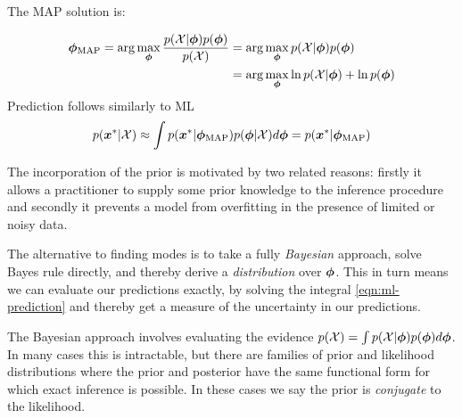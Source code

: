 The MAP solution is:

\begin{align}
{ { {  \bm \phi  } }_{\text{MAP}} } = \arg \max_{{ \bm \phi }} \frac{p({ \mathcal{X} } | { \bm \phi })p({ \bm \phi })}{p({ \mathcal{X} })}
 & = \arg \max_{{ \bm \phi }} p({ \mathcal{X} } | { \bm \phi })p({ \bm \phi }) \\
 & = \arg \max_{ \bm \phi } \ln p({ \mathcal{X} } | { \bm \phi }) + \ln p({ \bm \phi })
\end{align}
Prediction follows similarly to ML
\begin{align}
p({ \bm x^{*} } | { \mathcal{X} }) \approx \int p({ \bm x^{*} } | { {{ \bm \phi }}_{\text{MAP}} })p({ \bm \phi }|{ \mathcal{X} })d{ \bm \phi } = p({ \bm x^{*} } | { {{ \bm \phi }}_{\text{MAP}} })
\end{align}



The incorporation of the prior is motivated by two related reasons: firstly it allows a practitioner to supply some prior knowledge to the inference procedure and secondly it prevents a model from overfitting in the presence of limited or noisy data.

The alternative to finding modes is to take a fully \emph{Bayesian} approach, solve Bayes rule directly, and thereby derive a \emph{distribution} over ${ \bm \phi }$. This in turn means we can evaluate our predictions exactly, by solving the integral \eqref{eqn:ml-prediction} and thereby get a measure of the uncertainty in our predictions.

The Bayesian approach involves evaluating the evidence $p({ \mathcal{X} }) = \int p({ \mathcal{X} } | { \bm \phi }) p({ \bm \phi }) d{ \bm \phi }$. In many cases this is intractable, but there are families of prior and likelihood distributions where the prior and posterior have the same functional form for which exact inference is possible. In these cases we say the prior is \emph{conjugate} to the likelihood.

